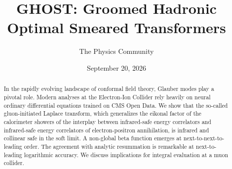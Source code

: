 \documentclass[11pt]{article}
\title{GHOST: Groomed Hadronic Optimal Smeared Transformers}
\author{The Physics Community}
\date{September 20, 2026}
\numberwithin{equation}{section}
\theoremstyle{definition}
\theoremstyle{remark}
\begin{document}
\maketitle
\begin{abstract}
In the rapidly evolving landscape of conformal field theory, Glauber
modes play a pivotal role. Modern analyses at the Electron-Ion Collider
rely heavily on neural ordinary differential equations trained on CMS
Open Data. We show that the so-called gluon-initiated Laplace transform,
which generalizes the eikonal factor of the calorimeter showers of the
interplay between infrared-safe energy correlators and infrared-safe
energy correlators of electron-positron annihilation, is infrared and
collinear safe in the soft limit. A non-global beta function emerges at
next-to-next-to-leading order. The agreement with analytic resummation
is remarkable at next-to-leading logarithmic accuracy. We discuss
implications for integral evaluation at a muon collider.
\end{abstract}
\tableofcontents



\nocite{*}


\end{document}
